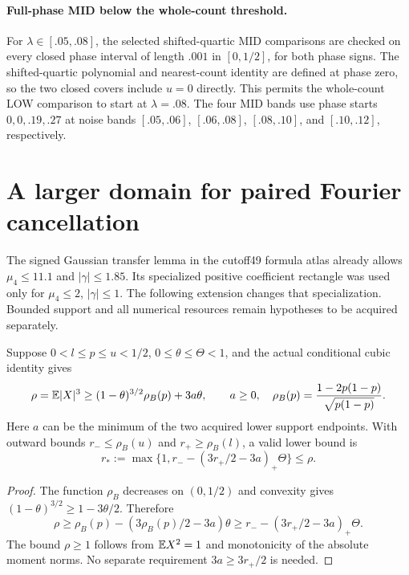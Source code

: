 \paragraph{Full-phase MID below the whole-count threshold.}
For $\lambda\in[.05,.08]$, the selected shifted-quartic MID comparisons
are checked on every closed phase interval of length $.001$ in
$[0,1/2]$, for both phase signs. The shifted-quartic polynomial and
nearest-count identity are defined at phase zero, so the two closed covers
include $u=0$ directly. This permits the whole-count LOW comparison to
start at $\lambda=.08$. The four MID bands use phase starts
$0,0,.19,.27$ at noise bands $[.05,.06]$, $[.06,.08]$,
$[.08,.10]$, and $[.10,.12]$, respectively.


\section{A larger domain for paired Fourier cancellation}

The signed Gaussian transfer lemma in the cutoff49 formula atlas already
allows $\mu_4\le11.1$ and $|\gamma|\le1.85$. Its specialized positive
coefficient rectangle was used only for $\mu_4\le2$, $|\gamma|\le1$.
The following extension changes that specialization. Bounded support and
all numerical resources remain hypotheses to be acquired separately.

\begin{proposition}
Suppose $0<l\le p\le u<1/2$, $0\le\theta\le\Theta<1$, and the actual
conditional cubic identity gives
\[
 \rho=\mathbb E|X|^3\ge(1-\theta)^{3/2}\rho_B(p)+3a\theta,
 \qquad a\ge0,\quad
 \rho_B(p)=\frac{1-2p(1-p)}{\sqrt{p(1-p)}}.
\]
Here $a$ can be the minimum of the two acquired lower support endpoints.
With outward bounds $r_-\le\rho_B(u)$ and $r_+\ge\rho_B(l)$, a valid
lower bound is
\[
 r_*:=\max\{1,r_--(3r_+/2-3a)_+\Theta\}\le\rho.
\]
\end{proposition}
\begin{proof}
The function $\rho_B$ decreases on $(0,1/2)$ and convexity gives
$(1-\theta)^{3/2}\ge1-3\theta/2$. Therefore
\[
 \rho\ge\rho_B(p)-(3\rho_B(p)/2-3a)\theta
 \ge r_--(3r_+/2-3a)_+\Theta.
\]
The bound $\rho\ge1$ follows from $\mathbb E X^2=1$ and monotonicity of the
absolute moment norms. No separate requirement $3a\ge3r_+/2$ is needed.
\end{proof}

